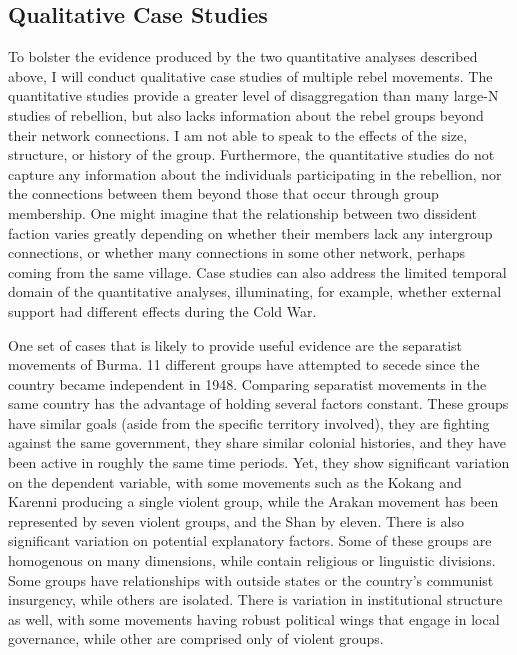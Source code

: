 \subsection{Qualitative Case Studies}

To bolster the evidence produced by the two quantitative analyses described above, I will conduct qualitative case studies of multiple rebel movements. The quantitative studies provide a greater level of disaggregation than many large-N studies of rebellion, but also lacks information about the rebel groups beyond their network connections. I am not able to speak to the effects of the size, structure, or history of the group. Furthermore, the quantitative studies do not capture any information about the individuals participating in the rebellion, nor the connections between them beyond those that occur through group membership. One might imagine that the relationship between two dissident faction varies greatly depending on whether their members lack any intergroup connections, or whether many connections in some other network, perhaps coming from the same village. Case studies can also address the limited temporal domain of the quantitative analyses, illuminating, for example, whether external support had different effects during the Cold War.

One set of cases that is likely to provide useful evidence are the separatist movements of Burma. 11 different groups have attempted to secede since the country became independent in 1948. Comparing separatist movements in the same country has the advantage of holding several factors constant. These groups have similar goals (aside from the specific territory involved), they are fighting against the same government, they share similar colonial histories, and they have been active in roughly the same time periods. Yet, they show significant variation on the dependent variable, with some movements such as the Kokang and Karenni producing a single violent group, while the Arakan movement has been represented by seven violent groups, and the Shan by eleven. There is also significant variation on potential explanatory factors. Some of these groups are homogenous on many dimensions, while contain religious or linguistic divisions. Some groups have relationships with outside states or the country's communist insurgency, while others are isolated. There is variation in institutional structure as well, with some movements having robust political wings that engage in local governance, while other are comprised only of violent groups.

